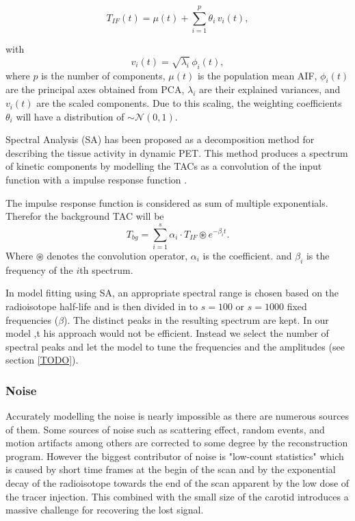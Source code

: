 \begin{equation}
	T_{IF}(t) = \mu(t) + \sum_{i=1}^p \theta_i\,v_i(t),
\end{equation}

with
\[
	v_i(t) = \sqrt{\lambda_i}\,\phi_i(t),
\]
where $p$ is the number of components, \(\mu(t)\) is the population mean AIF, \(\phi_i(t)\) are the principal axes obtained from PCA, \(\lambda_i\) are their explained variances, and \(v_i(t)\) are the scaled components. Due to this scaling, the weighting coefficients \(\theta_i\) will have a distribution of \(\sim \mathcal{N}(0,1)\).

Spectral Analysis (SA) has been proposed as a decomposition method for describing the tissue activity in dynamic PET.
This method produces a spectrum of kinetic components by modelling the TACs as a convolution of the input function with a impulse response function \cite{TODO}.

The impulse response function is considered as sum of multiple exponentials. Therefor the background TAC will be
\[
	T_{bg} = \sum_{i=1}^s \alpha_{i} \cdot T_{IF} \circledast e^{-\beta_{i} t}.
\]
Where $\circledast$ denotes the convolution operator, \(\alpha_i\) is the coefficient. and \(\beta_i\) is the frequency of the \(i\)th spectrum.

In model fitting using SA, an appropriate spectral range is chosen based on the radioisotope half-life and is then divided in to $s=100$ or $s=1000$ fixed frequencies ($\beta$).
The distinct peaks in the resulting spectrum are kept.
In our model ,t his approach would not be efficient. Instead we select the number of spectral peaks and let the model to tune the frequencies and the amplitudes (see section \ref{TODO}).

\subsubsection{Noise}

Accurately modelling the noise is nearly impossible as there are numerous sources of them.
Some sources of noise such as scattering effect, random events, and motion artifacts among others are corrected to some degree by the reconstruction program.
However the biggest contributor of noise is "low-count statistics" which is caused by short time frames at the begin of the scan and by the exponential decay of the radioisotope towards the end of the scan apparent by the low dose of the tracer injection.
This combined with the small size of the carotid introduces a massive challenge for recovering the lost signal.

